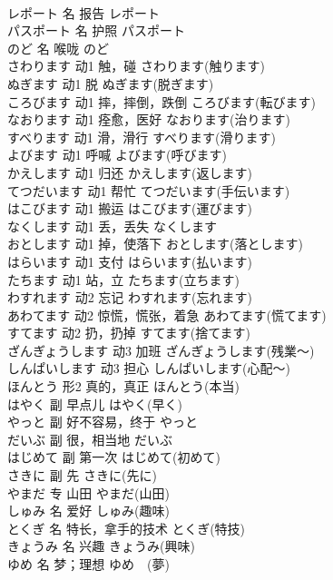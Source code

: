 \documentclass[8pt]{extreport}
\begin{document}
\begin{CJK}{UTF8}{min}
\\	レポート	名	报告	レポート	
\\	パスポート	名	护照	パスポート	
\\	のど	名	喉咙	のど	
\\	さわります	动1	触，碰	さわります(触ります)	
\\	ぬぎます	动1	脱	ぬぎます(脱ぎます)	
\\	ころびます	动1	摔，摔倒，跌倒	ころびます(転びます)	
\\	なおります	动1	痊愈，医好	なおります(治ります)	
\\	すべります	动1	滑，滑行	すべります(滑ります)	
\\	よびます	动1	呼喊	よびます(呼びます)	
\\	かえします	动1	归还	かえします(返します)	
\\	てつだいます	动1	帮忙	てつだいます(手伝います)	
\\	はこびます	动1	搬运	はこびます(運びます)	
\\	なくします	动1	丢，丢失	なくします	
\\	おとします	动1	掉，使落下	おとします(落とします)	
\\	はらいます	动1	支付	はらいます(払います)	
\\	たちます	动1	站，立	たちます(立ちます)	
\\	わすれます	动2	忘记	わすれます(忘れます)	
\\	あわてます	动2	惊慌，慌张，着急	あわてます(慌てます)	
\\	すてます	动2	扔，扔掉	すてます(捨てます)	
\\	ざんぎょうします	动3	加班	ざんぎょうします(残業～)	
\\	しんぱいします	动3	担心	しんぱいします(心配～)	
\\	ほんとう	形2	真的，真正	ほんとう(本当)	
\\	はやく	副	早点儿	はやく(早く)	
\\	やっと	副	好不容易，终于	やっと	
\\	だいぶ	副	很，相当地	だいぶ	
\\	はじめて	副	第一次	はじめて(初めて)	
\\	さきに	副	先	さきに(先に)	
\\	やまだ	专	山田	やまだ(山田)	
\\	しゅみ	名	爱好	しゅみ(趣味)	
\\	とくぎ	名	特长，拿手的技术	とくぎ(特技)	
\\	きょうみ	名	兴趣	きょうみ(興味)	
\\	ゆめ	名	梦；理想	ゆめ　(夢)	

\end{CJK}
\end{document}
